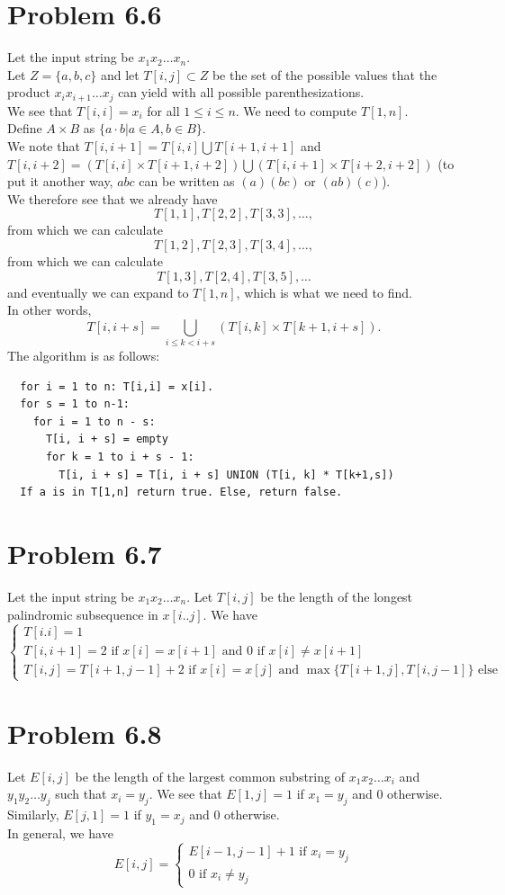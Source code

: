 \documentclass[12pt]{report}
\begin{document}
\section{Problem 6.6}
Let the input string be $x_1 x_2 \ldots x_n$. \\
Let $Z = \{a,b,c\}$ and let $T[i,j] \subset Z$ be the set of the possible values that the product $x_i x_{i+1} \ldots x_{j}$ can yield with all possible parenthesizations. \\
We see that $T[i,i] = x_i$ for all $1 \le i \le n$. We need to compute $T[1,n]$. \\
Define $A \times B$ as $\{ a \cdot b | a \in A, b \in B\}$. \\
We note that $T[i, i+1] = T[i,i] \bigcup T[i+1, i+1]$ and $T[i,i+2] = (T[i,i] \times T[i+1, i+2]) \bigcup (T[i,i+1] \times T[i+2,i+2])$ (to put it another way, $abc$ can be written as $(a)(bc)$ or $(ab)(c)$). \\
We therefore see that we already have $$T[1,1], T[2,2], T[3,3], \ldots,$$
from which we can calculate $$T[1,2], T[2,3], T[3,4], \ldots,$$
from which we can calculate $$T[1,3], T[2,4], T[3,5], \ldots $$
and eventually we can expand to $T[1,n]$, which is what we need to find.\\
In other words, $$T[i, i + s] = \bigcup_{i \le k < i + s} (T[i,k] \times T[k+1, i + s]).$$
The algorithm is as follows:
\begin{lstlisting}
  for i = 1 to n: T[i,i] = x[i].
  for s = 1 to n-1:
    for i = 1 to n - s:
      T[i, i + s] = empty
      for k = 1 to i + s - 1:
        T[i, i + s] = T[i, i + s] UNION (T[i, k] * T[k+1,s])
  If a is in T[1,n] return true. Else, return false.
\end{lstlisting}

\section{Problem 6.7}
Let the input string be $x_1 x_2 \ldots x_n$. Let $T[i,j]$ be the length of the longest palindromic subsequence in $x[i..j]$. We have $$\begin{cases} T[i.i] = 1 \\ T[i,i+1] = 2 \text{ if } x[i] = x[i+1] \text{ and } 0 \text{ if } x[i] \ne x[i+1] \\ T[i,j] = T[i+1,j-1] + 2 \text{ if } x[i] = x[j] \text{ and } \max \{T[i+1,j], T[i,j-1]\} \text{ else} \end{cases}$$

\section{Problem 6.8}
Let $E[i,j]$ be the length of the largest common substring of $x_1 x_2 \ldots x_i$ and $y_1 y_2 \ldots y_j$ such that $x_i = y_j$. We see that $E[1,j] = 1$ if $x_1 = y_j$ and $0$ otherwise. Similarly, $E[j,1] = 1$ if $y_1 = x_j$ and $0$ otherwise.\\
In general, we have $$E[i,j] = \begin{cases} E[i-1,j-1] + 1 \text{ if } x_i = y_j \\ 0 \text{ if } x_i \ne y_j \end{cases}$$
\end{document}
